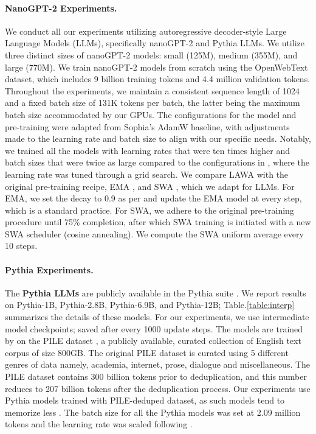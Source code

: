 \documentclass{article}
\newcommand{\method}{LAWA}
\begin{document}
\paragraph{NanoGPT-2 Experiments.} We conduct all our experiments utilizing autoregressive decoder-style Large Language Models (LLMs), specifically nanoGPT-2 and Pythia LLMs. We utilize three distinct sizes of nanoGPT-2 models: small (125M), medium (355M), and large (770M). We train nanoGPT-2 models from scratch using the OpenWebText dataset, which includes 9 billion training tokens and 4.4 million validation tokens. Throughout the experiments, we maintain a consistent sequence length of 1024 and a fixed batch size of 131K tokens per batch, the latter being the maximum batch size accommodated by our GPUs. The configurations for the model and pre-training were adapted from Sophia's \citep{liu2023sophia} AdamW baseline, with adjustments made to the learning rate and batch size to align with our specific needs. Notably, we trained all the models with learning rates that were ten times higher and batch sizes that were twice as large compared to the configurations in \cite{liu2023sophia}, where the learning rate was tuned through a grid search. We compare \method{} with the original pre-training recipe, EMA \citep{szegedy2015rethinking}, and SWA \citep{SWA}, which we adapt for LLMs. For EMA, we set the decay to 0.9 as per \cite{lawa} and update the EMA model at every step, which is a standard practice. For SWA, we adhere to the original pre-training procedure until 75\% completion, after which SWA training is initiated with a new SWA scheduler (cosine annealing). We compute the SWA uniform average every 10 steps.

\paragraph{Pythia Experiments.}The \textbf{Pythia LLMs} are publicly available in the Pythia suite \citep{biderman2023pythia}. We report results on Pythia-1B, Pythia-2.8B, Pythia-6.9B, and Pythia-12B; Table.\ref{table:interp} summarizes the details of these models. For our experiments, we use intermediate model checkpoints; saved after every 1000 update steps. The models are trained by \citet{biderman2023pythia} on the PILE dataset \citep{gao2020pile}, a publicly available, curated collection of English text corpus of size 800GB. The original PILE dataset is curated using 5 different genres of data namely, academia, internet, prose, dialogue and miscellaneous. The PILE dataset contains 300 billion tokens prior to deduplication, and this number reduces to 207 billion tokens after the deduplication process. Our experiments use Pythia models trained with PILE-deduped dataset, as such models tend to memorize less \citep{lee2021deduplicating}. The batch size for all the Pythia models was set at 2.09 million tokens and the learning rate was scaled following \cite{zhang2022opt}.
\end{document}
